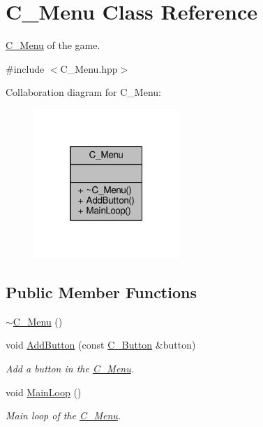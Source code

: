 \hypertarget{classC__Menu}{}\section{C\+\_\+\+Menu Class Reference}
\label{classC__Menu}


\hyperlink{classC__Menu}{C\+\_\+\+Menu} of the game.  




{\ttfamily \#include $<$C\+\_\+\+Menu.\+hpp$>$}



Collaboration diagram for C\+\_\+\+Menu\+:\nopagebreak
\begin{figure}[H]
\begin{center}
\leavevmode
\includegraphics[width=157pt]{classC__Menu__coll__graph}
\end{center}
\end{figure}
\subsection*{Public Member Functions}
\begin{DoxyCompactItemize}
\item 
\hyperlink{classC__Menu_a4b1250911f29522e9766f5ad2f02b595}{$\sim$\+C\+\_\+\+Menu} ()
\item 
void \hyperlink{classC__Menu_a9a4f7a0022f39f35b7af9c5d2b6f31ec}{Add\+Button} (const \hyperlink{classC__Button}{C\+\_\+\+Button} \&button)
\begin{DoxyCompactList}\small\item\em Add a button in the \hyperlink{classC__Menu}{C\+\_\+\+Menu}. \end{DoxyCompactList}\item 
void \hyperlink{classC__Menu_a9529be708fad2c6deca21034bc37f59d}{Main\+Loop} ()
\begin{DoxyCompactList}\small\item\em Main loop of the \hyperlink{classC__Menu}{C\+\_\+\+Menu}. \end{DoxyCompactList}\end{DoxyCompactItemize}


